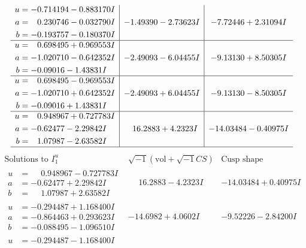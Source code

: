 \documentclass[1p]{elsarticle_modified}
\theoremstyle{definition}
\newcommand{\I}{\sqrt{-1}}
\begin{document}
$$\begin{array}{c|c|c}
\begin{aligned}
u &= -0.714194 - 0.883170 I \\
a &= \phantom{-}0.230746 - 0.032790 I \\
b &= -0.193757 - 0.180370 I\end{aligned}
 & -1.49390 - 2.73623 I & -7.72446 + 2.31094 I \\ \hline\begin{aligned}
u &= \phantom{-}0.698495 + 0.969553 I \\
a &= -1.020710 - 0.642352 I \\
b &= -0.09016 - 1.43831 I\end{aligned}
 & -2.49093 - 6.04455 I & -9.13130 + 8.50305 I \\ \hline\begin{aligned}
u &= \phantom{-}0.698495 - 0.969553 I \\
a &= -1.020710 + 0.642352 I \\
b &= -0.09016 + 1.43831 I\end{aligned}
 & -2.49093 + 6.04455 I & -9.13130 - 8.50305 I \\ \hline\begin{aligned}
u &= \phantom{-}0.948967 + 0.727783 I \\
a &= -0.62477 - 2.29842 I \\
b &= \phantom{-}1.07987 - 2.63582 I\end{aligned}
 & \phantom{-}16.2883 + 4.2323 I & -14.03484 - 0.40975 I\\
 \hline 
 \end{array}$$\newpage$$\begin{array}{c|c|c}  
\text{Solutions to }I^u_{1}& \I (\text{vol} + \sqrt{-1}CS) & \text{Cusp shape}\\
 \hline 
\begin{aligned}
u &= \phantom{-}0.948967 - 0.727783 I \\
a &= -0.62477 + 2.29842 I \\
b &= \phantom{-}1.07987 + 2.63582 I\end{aligned}
 & \phantom{-}16.2883 - 4.2323 I & -14.03484 + 0.40975 I \\ \hline\begin{aligned}
u &= -0.294487 + 1.168400 I \\
a &= -0.864463 + 0.293623 I \\
b &= -0.088495 - 1.096510 I\end{aligned}
 & -14.6982 + 4.0602 I & -9.52226 - 2.84200 I \\ \hline\begin{aligned}
u &= -0.294487 - 1.168400 I \\

\end{aligned}
\end{array}$$
\end{document}
